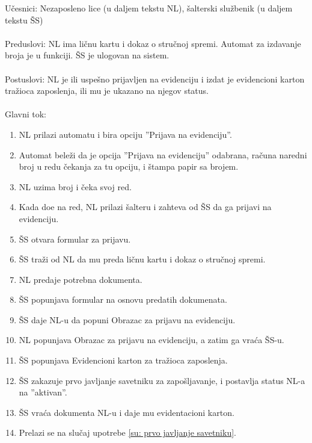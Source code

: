 \noindent U\v cesnici: Nezaposleno lice (u daljem tekstu NL), \v salterski slu\v zbenik (u daljem tekstu \v SS)
\\
\\ Preduslovi: NL ima li\v cnu kartu i dokaz o stru\v cnoj spremi. Automat za izdavanje broja je u funkciji. \v SS je ulogovan na sistem. 
\\
\\ Postuslovi: NL je ili uspe\v sno prijavljen na evidenciju i izdat je evidencioni karton tra\v zioca zaposlenja, ili mu je ukazano na njegov status.
\\
\\ Glavni tok:
\begin{enumerate}
	\item NL prilazi automatu i bira opciju ''Prijava na evidenciju''.
	\item Automat bele\v zi da je opcija ''Prijava na evidenciju'' odabrana, ra\v cuna naredni broj u redu \v cekanja za tu opciju, i \v stampa papir sa brojem.
	\item NL uzima broj i \v ceka svoj red.
	\item Kada do\dj e na red, NL prilazi \v salteru i zahteva od \v SS da ga prijavi na evidenciju.
	\item \v SS otvara formular za prijavu.
	\item \v SS tra\v zi od NL da mu preda li\v cnu kartu i dokaz o stru\v cnoj spremi.
	\item NL predaje potrebna dokumenta. 
	\item \v SS popunjava formular na osnovu predatih dokumenata.
	\item \v SS daje NL-u da popuni Obrazac za prijavu na evidenciju.
	\item NL popunjava Obrazac za prijavu na evidenciju, a zatim ga vra\' ca \v SS-u.
	\item \v SS popunjava Evidencioni karton za tra\v zioca zaposlenja.
	\item \v SS zakazuje prvo javljanje savetniku za zapo\v sljavanje, i postavlja status NL-a na ''aktivan''.
	\item \v SS vra\' ca dokumenta NL-u i daje mu evidentacioni karton.
	\item Prelazi se na slu\v caj upotrebe \ref{su: prvo javljanje savetniku}.
\end{enumerate}

